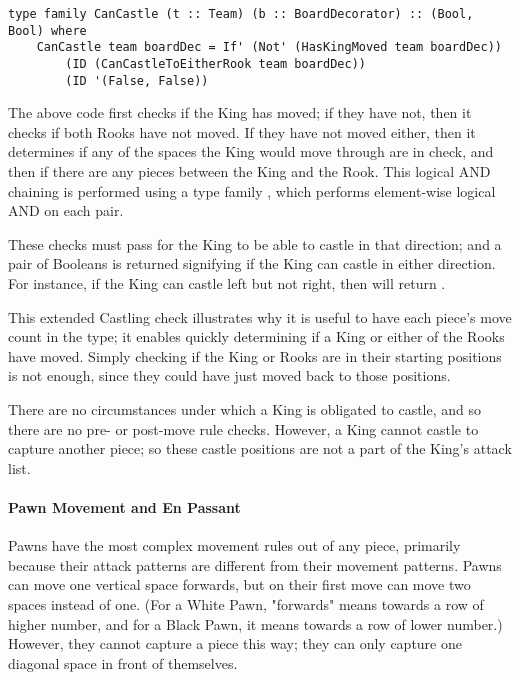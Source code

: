 \begin{lstlisting}
type family CanCastle (t :: Team) (b :: BoardDecorator) :: (Bool, Bool) where
    CanCastle team boardDec = If' (Not' (HasKingMoved team boardDec))
        (ID (CanCastleToEitherRook team boardDec))
        (ID '(False, False))
\end{lstlisting}

The above code first checks if the King has moved; if they have not, then it checks if both Rooks have not moved. If they have not moved either, then it determines if any of the spaces the King would move through are in check, and then if there are any pieces between the King and the Rook. This logical AND chaining is performed using a type family , which performs element-wise logical AND on each pair.

These checks must pass for the King to be able to castle in that direction; and a pair of Booleans is returned signifying if the King can castle in either direction. For instance, if the King can castle left but not right, then  will return .

This extended Castling check illustrates why it is useful to have each piece's move count in the  type; it enables quickly determining if a King or either of the Rooks have moved. Simply checking if the King or Rooks are in their starting positions is not enough, since they could have just moved back to those positions.

There are no circumstances under which a King is obligated to castle, and so there are no pre- or post-move rule checks. However, a King cannot castle to capture another piece; so these castle positions are not a part of the King's attack list.

\paragraph{Pawn Movement and En Passant} \label{passantsection}

Pawns have the most complex movement rules out of any piece, primarily because their attack patterns are different from their movement patterns. Pawns can move one vertical space forwards, but on their first move can move two spaces instead of one. (For a White Pawn, "forwards" means towards a row of higher number, and for a Black Pawn, it means towards a row of lower number.) However, they cannot capture a piece this way; they can only capture one diagonal space in front of themselves.

